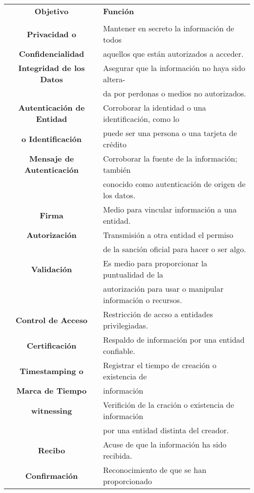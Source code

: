 \documentclass[12pt]{article}
\begin{document}
\begin{table}[h]
\centering
	\begin{tabular}{ c | l  }
	\hline
\textbf{Objetivo} & \textbf{Función} \\ 
 & \\ \hline
\textbf{Privacidad o} & Mantener en secreto la información de todos  \\
\textbf{Confidencialidad} & aquellos que están autorizados a acceder. \\ \hline 
\textbf{Integridad de los Datos} & Asegurar que la información no haya sido altera- \\ 
 				 & da por perdonas o medios no autorizados. \\ \hline
\textbf{Autenticación de Entidad} & Corroborar la identidad o una identificación, como lo\\
\textbf{ o Identificación} & puede ser una persona o una tarjeta de crédito\\ \hline
\textbf{Mensaje de Autenticación} & Corroborar la fuente de la información; también \\
 & conocido como autenticación de origen de los datos. \\ \hline
\textbf{Firma} & Medio para vincular información a una entidad. \\ \hline
\textbf{Autorización} & Transmisión a otra entidad el permiso \\
		      & de la sanción oficial para hacer o ser algo.\\ \hline 
\textbf{Validación} & Es medio para proporcionar la puntualidad de la \\ 
		    & autorización para usar o manipular información o recursos. \\ \hline 
\textbf{Control de Acceso} & Restricción de accso a entidades privilegiadas. \\ \hline
\textbf{Certificación} & Respaldo de información por una entidad confiable. \\ \hline
\textbf{Timestamping o} & Registrar el tiempo de creación o existencia de \\
\textbf{Marca de Tiempo} & información \\ \hline
\textbf{witnessing} & Verifición de la cración o existencia de información \\ 
	            & por una entidad distinta del creador. \\ \hline
\textbf{Recibo} & Acuse de que la información ha sido recibida. \\ \hline
\textbf{Confirmación} & Reconocimiento de que se han proporcionado \\

\end{tabular}
\end{table}
\end{document}
